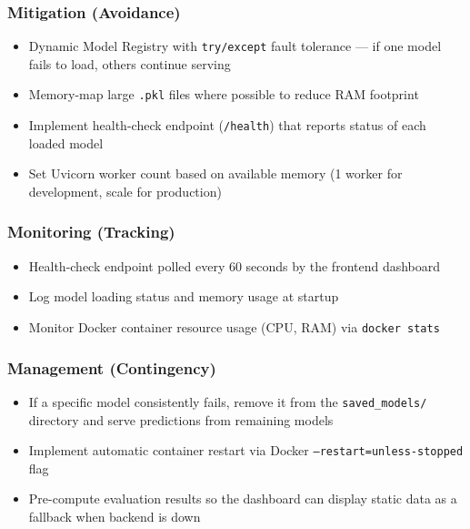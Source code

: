 \documentclass[11pt, a4paper]{article}
\newcommand{\col}[1]{\texttt{\small #1}}
\begin{document}
\subsubsection*{Mitigation (Avoidance)}
\begin{itemize}[leftmargin=*]
    \item Dynamic Model Registry with \col{try/except} fault tolerance --- if one model fails to load, others continue serving
    \item Memory-map large \col{.pkl} files where possible to reduce RAM footprint
    \item Implement health-check endpoint (\col{/health}) that reports status of each loaded model
    \item Set Uvicorn worker count based on available memory (1 worker for development, scale for production)
\end{itemize}

\subsubsection*{Monitoring (Tracking)}
\begin{itemize}[leftmargin=*]
    \item Health-check endpoint polled every 60 seconds by the frontend dashboard
    \item Log model loading status and memory usage at startup
    \item Monitor Docker container resource usage (CPU, RAM) via \col{docker stats}
\end{itemize}

\subsubsection*{Management (Contingency)}
\begin{itemize}[leftmargin=*]
    \item If a specific model consistently fails, remove it from the \col{saved\_models/} directory and serve predictions from remaining models
    \item Implement automatic container restart via Docker \col{--restart=unless-stopped} flag
    \item Pre-compute evaluation results so the dashboard can display static data as a fallback when backend is down
\end{itemize}

\newpage

\end{document}
